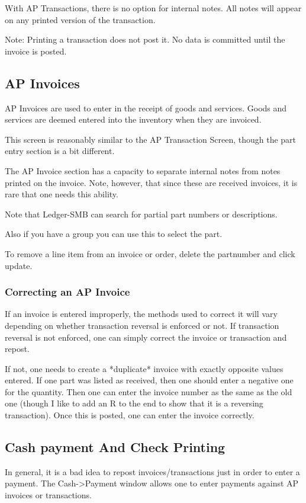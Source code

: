 \documentclass{article}
\begin{document}
With AP Transactions, there is no option for internal notes.  All notes will
appear on any printed version of the transaction.

Note: Printing a transaction does not post it.  No data is committed until the
invoice is posted.

\subsection{AP Invoices}
AP Invoices are used to enter in the receipt of goods and services.  Goods and
services are deemed entered into the inventory when they are invoiced.

This screen is reasonably similar to the AP Transaction Screen, though the part
entry section is a bit different.

The AP Invoice section has a capacity to separate internal notes from notes
printed on the invoice.  Note, however, that since these are received invoices,
it is rare that one needs this ability.

Note that Ledger-SMB can search for partial part numbers or descriptions.

Also if you have a group you can use this to select the part.

To remove a line item from an invoice or order, delete the partnumber and click
update.

\subsubsection{Correcting an AP Invoice}
If an invoice is entered improperly, the methods used to correct it will vary
depending on whether transaction reversal is enforced or not.  If transaction
reversal is not enforced, one can simply correct the invoice or transaction and
repost.

If not, one needs to create a *duplicate* invoice with exactly opposite values
entered.  If one part was listed as received, then one should enter a negative
one for the quantity.  Then one can enter the invoice number as the same as the
old one (though I like to add an R to the end to show that it is a reversing
transaction).  Once this is posted, one can enter the invoice correctly.

\subsection{Cash payment And Check Printing}
In general, it is a bad idea to repost invoices/transactions just in order to
enter a payment.  The Cash-\textgreater Payment window allows one to enter payments against
AP invoices or transactions.
\end{document}
